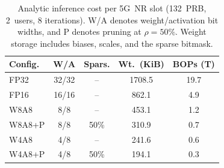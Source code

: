 \begin{table}[t]
\centering
\caption{Analytic inference cost per 5G~NR slot (132~PRB, 2~users,
8 iterations). W/A denotes weight/activation bit widths, and P denotes
pruning at $\rho=50\%$. Weight storage includes biases, scales, and the
sparse bitmask.}
\label{tab:complexity}
\footnotesize
\setlength{\tabcolsep}{3.5pt}
\begin{tabular}{@{}lcccc@{}}
\toprule
Config. & W/A & Spars. & Wt.\ (KiB)  & BOPs (T) \\
\midrule
FP32        & 32/32 & --   & 1708.5  & 19.7 \\
FP16        & 16/16 & --   &  862.1  &  4.9 \\
W8A8        & 8/8   & --   &  453.1  &  1.2 \\
W8A8+P      & 8/8   & 50\% &  310.9 &  0.7 \\
W4A8        & 4/8   & --   &  241.6 &  0.6 \\
W4A8+P      & 4/8   & 50\% &  194.1 &  0.3 \\
\bottomrule
\end{tabular}
\end{table}

